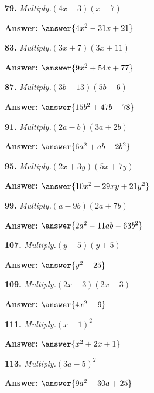 \documentclass{ximera}
\begin{document}
\begin{problem}
\textbf{79.} \emph{Multiply.}\quad $(4x - 3)(x - 7)$

\textbf{Answer:} $\answer{4x^2 -31x +21}$
\end{problem}

\begin{problem}
\textbf{83.} \emph{Multiply.}\quad $(3x + 7)(3x + 11)$

\textbf{Answer:} $\answer{9x^2 +54x +77}$
\end{problem}

\begin{problem}
\textbf{87.} \emph{Multiply.}\quad $(3b + 13)(5b - 6)$

\textbf{Answer:} $\answer{15b^2 +47b -78}$
\end{problem}

\begin{problem}
\textbf{91.} \emph{Multiply.}\quad $(2a - b)(3a + 2b)$

\textbf{Answer:} $\answer{6a^2 +ab -2b^2}$
\end{problem}

\begin{problem}
\textbf{95.} \emph{Multiply.}\quad $(2x + 3y)(5x + 7y)$

\textbf{Answer:} $\answer{10x^2 +29xy +21y^2}$
\end{problem}

\begin{problem}
\textbf{99.} \emph{Multiply.}\quad $(a - 9b)(2a + 7b)$

\textbf{Answer:} $\answer{2a^2 -11ab -63b^2}$
\end{problem}

\begin{problem}
\textbf{107.} \emph{Multiply.}\quad $(y - 5)(y + 5)$

\textbf{Answer:} $\answer{y^2 -25}$
\end{problem}

\begin{problem}
\textbf{109.} \emph{Multiply.}\quad $(2x + 3)(2x - 3)$

\textbf{Answer:} $\answer{4x^2 -9}$
\end{problem}

\begin{problem}
\textbf{111.} \emph{Multiply.}\quad $(x + 1)^2$

\textbf{Answer:} $\answer{x^2 +2x +1}$
\end{problem}

\begin{problem}
\textbf{113.} \emph{Multiply.}\quad $(3a - 5)^2$

\textbf{Answer:} $\answer{9a^2 -30a +25}$
\end{problem}
\end{document}

